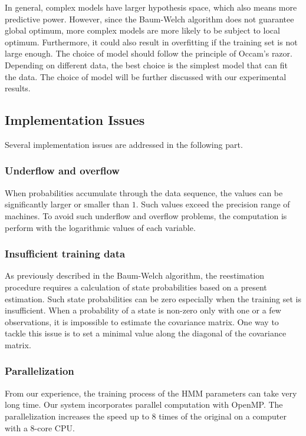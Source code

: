 \documentclass[12pt,final,twoside]{report}
\begin{document}
In general, complex models have larger hypothesis space, which also means more predictive power. However, since the Baum-Welch algorithm does not guarantee global optimum, more complex models are more likely to be subject to local optimum. Furthermore, it could also result in overfitting if the training set is not large enough. The choice of model should follow the principle of Occam's razor. Depending on different data, the best choice is the simplest model that can fit the data. The choice of model will be further discussed with our experimental results.

\subsection{Implementation Issues}
Several implementation issues are addressed in the following part.

\subsubsection{Underflow and overflow}

When probabilities accumulate through the data sequence, the values can be significantly larger or smaller than $1$. Such values exceed the precision range of machines. To avoid such underflow and overflow problems, the computation is perform with the logarithmic values of each variable. 

\subsubsection{Insufficient training data}

As previously described in the Baum-Welch algorithm, the reestimation procedure requires a calculation of state probabilities based on a present estimation. Such state probabilities can be zero especially when the training set is insufficient. When a probability of a state is non-zero only with one or a few observations, it is impossible to estimate the covariance matrix. One way to tackle this issue is to set a minimal value along the diagonal of the covariance matrix. 

\subsubsection{Parallelization}

From our experience, the training process of the HMM parameters can take very long time. Our system incorporates parallel computation with OpenMP. The parallelization increases the speed up to 8 times of the original on a computer with a 8-core CPU.
\end{document}
